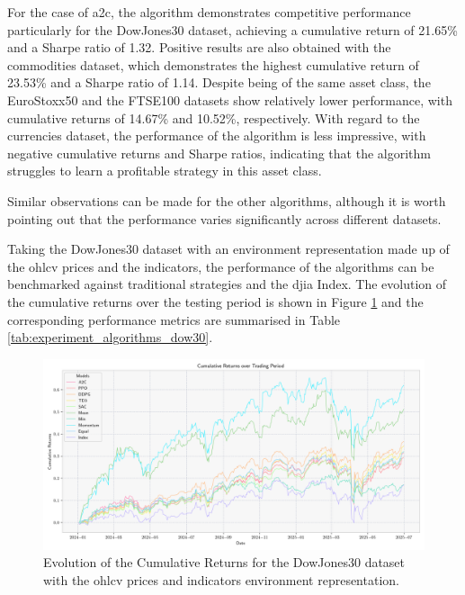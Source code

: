 

For the case of \acrshort{a2c}, the algorithm demonstrates competitive performance particularly for the DowJones30 dataset, achieving a cumulative return of 21.65\% and a Sharpe ratio of 1.32. Positive results are also obtained with the commodities dataset, which demonstrates the highest cumulative return of 23.53\% and a Sharpe ratio of 1.14. Despite being of the same asset class, the EuroStoxx50 and the FTSE100 datasets show relatively lower performance, with cumulative returns of 14.67\% and 10.52\%, respectively. With regard to the currencies dataset, the performance of the algorithm is less impressive, with negative cumulative returns and Sharpe ratios, indicating that the algorithm struggles to learn a profitable strategy in this asset class.

Similar observations can be made for the other algorithms, although it is worth pointing out that the performance varies significantly across different datasets. 

Taking the DowJones30 dataset with an environment representation made up of the \acrshort{ohlcv} prices and the indicators, the performance of the algorithms can be benchmarked against traditional strategies and the \acrshort{djia} Index. The evolution of the cumulative returns over the testing period is shown in Figure \ref{fig:dowjones30_indicators_cumulative_returns} and the corresponding performance metrics are summarised in Table \ref{tab:experiment_algorithms_dow30}.

\begin{figure}
    \centering
    \includegraphics[width=\textwidth]{figures/dowjones30_indicators_cumulative_returns.png}
    \caption{Evolution of the Cumulative Returns for the DowJones30 dataset with the \acrshort{ohlcv} prices and indicators environment representation.}
    \label{fig:dowjones30_indicators_cumulative_returns}
\end{figure}

